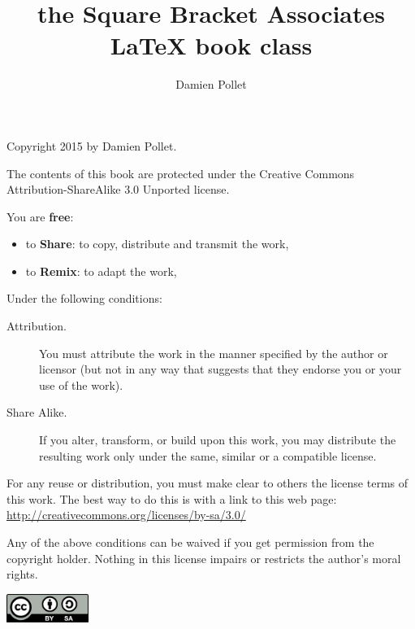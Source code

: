 \documentclass[english,twoside,openany,showtrims]{sbabook}
\title{the Square Bracket Associates\titlebreak{}
  \texorpdfstring{\protect\LaTeX}{LaTeX} book class}
\author{Damien Pollet}
\date{\gitdate\titlebreak[\smallskip]{ -- }\protect\gitCommitInfo}
\begin{document}
\maketitle
\pagestyle{titlingpage}
\thispagestyle{titlingpage} %

\cleartoverso
{\small

  Copyright 2015 by Damien Pollet.

  The contents of this book are protected under the Creative Commons
  Attribution-ShareAlike 3.0 Unported license.

  You are \textbf{free}:
  \begin{itemize}
  \item to \textbf{Share}: to copy, distribute and transmit the work,
  \item to \textbf{Remix}: to adapt the work,
  \end{itemize}

  Under the following conditions:
  \begin{description}
  \item[Attribution.] You must attribute the work in the manner specified by the
    author or licensor (but not in any way that suggests that they endorse you
    or your use of the work).
  \item[Share Alike.] If you alter, transform, or build upon this work, you may
    distribute the resulting work only under the same, similar or a compatible
    license.
  \end{description}

  For any reuse or distribution, you must make clear to others the
  license terms of this work. The best way to do this is with a link to
  this web page: \\
  \url{http://creativecommons.org/licenses/by-sa/3.0/}

  Any of the above conditions can be waived if you get permission from
  the copyright holder. Nothing in this license impairs or restricts the
  author's moral rights.

  \begin{center}
    \includegraphics[width=0.2\textwidth]{CreativeCommons-BY-SA.pdf}
  \end{center}

}
\end{document}
